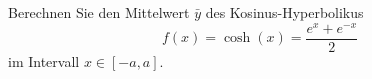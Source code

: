 \begin{ExerciseBlock}
Berechnen Sie den Mittelwert $\bar{y}$ des Kosinus-Hyperbolikus 
\begin{equation}
	f(x) = \cosh(x) = \frac{e^x + e^{-x}}{2}
\end{equation}
im Intervall $x \in \left[-a , a\right]$.

\end{ExerciseBlock}
